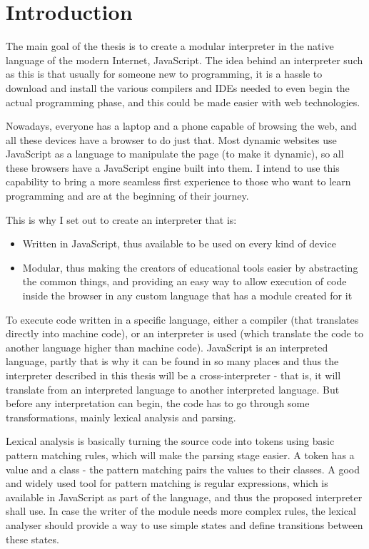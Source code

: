 \chapter*{Introduction}

The main goal of the thesis is to create a modular interpreter in the native language of the modern Internet, JavaScript. The idea behind an interpreter such as this is that usually for someone new to programming, it is a hassle to download and install the various compilers and IDEs needed to even begin the actual programming phase, and this could be made easier with web technologies.

Nowadays, everyone has a laptop and a phone capable of browsing the web, and all these devices have a browser to do just that. Most dynamic websites use JavaScript as a language to manipulate the page (to make it dynamic), so all these browsers have a JavaScript engine built into them. I intend to use this capability to bring a more seamless first experience to those who want to learn programming and are at the beginning of their journey. 

This is why I set out to create an interpreter that is:
\begin{itemize}
\item Written in JavaScript, thus available to be used on every kind of device
\item Modular, thus making the creators of educational tools easier by abstracting the common things, and providing an easy way to allow execution of code inside the browser in any custom language that has a module created for it
\end{itemize}

To execute code written in a specific language, either a compiler (that translates directly into machine code), or an interpreter is used (which translate the code to another language higher than machine code). JavaScript is an interpreted language, partly that is why it can be found in so many places and thus the interpreter described in this thesis will be a cross-interpreter - that is, it will translate from an interpreted language to another interpreted language. But before any interpretation can begin, the code has to go through some transformations, mainly lexical analysis and parsing.

Lexical analysis is basically turning the source code into tokens using basic pattern matching rules, which will make the parsing stage easier. A token has a value and a class - the pattern matching pairs the values to their classes. A good and widely used tool for pattern matching is regular expressions, which is available in JavaScript as part of the language, and thus the proposed interpreter shall use. In case the writer of the module needs more complex rules, the lexical analyser should provide a way to use simple states and define transitions between these states.

